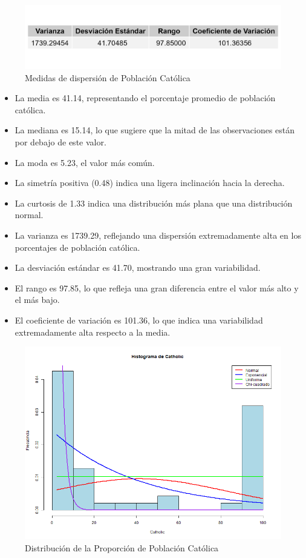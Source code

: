 \documentclass{article}
\begin{document}
\begin{figure}[h!]
 \centering
 \includegraphics[width=\textwidth]{Swiss/Catholic_dispersion.png}
 \caption{Medidas de dispersión de Población Católica}
\end{figure}
   \begin{itemize}
       \item La media es 41.14, representando el porcentaje promedio de población católica.
       \item La mediana es 15.14, lo que sugiere que la mitad de las observaciones están por debajo de este valor.
       \item La moda es 5.23, el valor más común.
       \item La simetría positiva (0.48) indica una ligera inclinación hacia la derecha.
       \item La curtosis de 1.33 indica una distribución más plana que una distribución normal.
       \item La varianza es 1739.29, reflejando una dispersión extremadamente alta en los porcentajes de población católica.
       \item La desviación estándar es 41.70, mostrando una gran variabilidad.
       \item El rango es 97.85, lo que refleja una gran diferencia entre el valor más alto y el más bajo.
       \item El coeficiente de variación es 101.36, lo que indica una variabilidad extremadamente alta respecto a la media.
   \end{itemize}

   \begin{figure}[h!]
    \centering
    \includegraphics[width=\textwidth]{Histogramas/histogram_catholic.png}
    \caption{Distribución de la Proporción de Población Católica}
    \end{figure}
\end{document}

